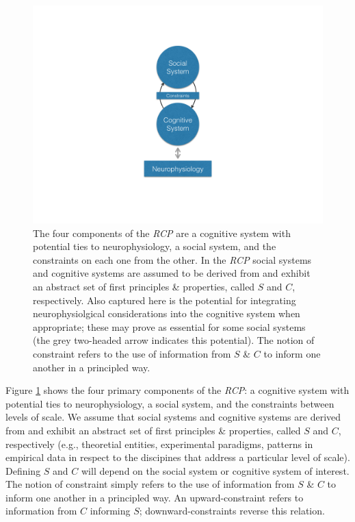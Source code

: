 \documentclass{article}
\begin{document}
\begin{figure}
	\centering
	\includegraphics[width=1.0\textwidth]{RCP_diagram.png}
	\caption{\label{fig:rcpdiagram} The four components of the \textit{RCP} are a cognitive system with potential ties to neurophysiology, a social system, and the constraints on each one from the other.  In the \textit{RCP} social systems and cognitive systems are assumed to be derived from and exhibit an abstract set of first principles \& properties, called $S$ and $C$, respectively.  Also captured here is the potential for integrating neurophysiolgical considerations into the cognitive system when appropriate; these may prove as essential for some social systems (the grey two-headed arrow indicates this potential). The notion of constraint refers to the use of information from $S$ \& $C$ to inform one another in a principled way.  
	}
\end{figure}

Figure \ref{fig:rcpdiagram} shows the four primary components of the \textit{RCP}: a cognitive system with potential ties to neurophysiology, a social system, and the constraints between levels of scale.  We assume that social systems and cognitive systems are derived from and exhibit an abstract set of first principles \& properties, called $S$ and $C$, respectively (e.g., theoretial entities, experimental paradigms, patterns in empirical data in respect to the discipines that address a particular level of scale).  Defining $S$ and $C$ will depend on the social system or cognitive system of interest.  The notion of constraint simply refers to the use of information from $S$ \& $C$ to inform one another in a principled way. An upward-constraint refers to information from $C$ informing $S$; downward-constraints reverse this relation.
\end{document}
